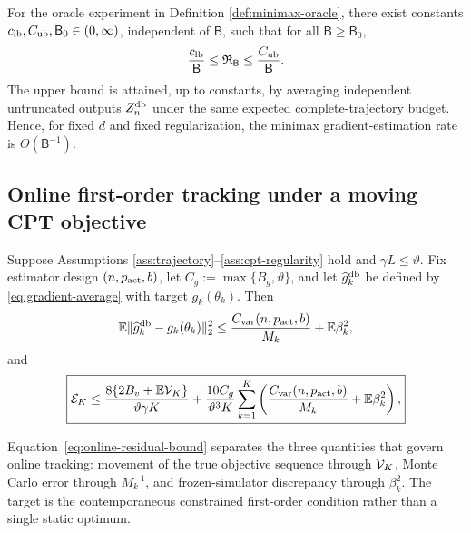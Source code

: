 \begin{theorem}\label{thm:minimax}
For the oracle experiment in Definition \ref{def:minimax-oracle}, there exist constants
$c_{\rm lb},C_{\rm ub},\mathsf B_0\in(0,\infty)$, independent of $\mathsf B$, such that for all $\mathsf B\ge\mathsf B_0$,
\begin{equation}\label{eq:minimax-rate}
 \frac{c_{\rm lb}}{\mathsf B}
 \le \mathfrak R_{\mathsf B}
 \le \frac{C_{\rm ub}}{\mathsf B}.
\end{equation}
The upper bound is attained, up to constants, by averaging independent untruncated outputs $Z_n^{\mathrm{db}}$ under the same expected complete-trajectory budget.  Hence, for fixed $d$ and fixed regularization, the minimax gradient-estimation rate is $\Theta(\mathsf B^{-1})$.
\end{theorem}

\subsection{Online first-order tracking under a moving CPT objective}

\begin{theorem}\label{thm:online-residual}
Suppose Assumptions \ref{ass:trajectory}--\ref{ass:cpt-regularity} hold and $\gamma L\le\vartheta$.  Fix estimator design $(n,p_{\rm act},b)$, let $C_g:=\max\{B_g,\vartheta\}$, and let $\widehat g_k^{\mathrm{db}}$ be defined by \eqref{eq:gradient-average} with target $\widetilde g_k(\theta_k)$.  Then
\begin{equation}\label{eq:true-gradient-mse}
 \mathbb E\lVert\widehat g_k^{\mathrm{db}}-g_k(\theta_k)\rVert_2^2
 \le\frac{C_{\rm var}(n,p_{\rm act},b)}{M_k}+\mathbb E\beta_k^2,
\end{equation}
and
\begin{equation}\label{eq:online-residual-bound}
 \boxed{
 \mathcal E_K
 \le
 \frac{8\{2B_v+\mathbb E\mathcal V_K\}}{\vartheta\gamma K}
 +\frac{10C_g}{\vartheta^3K}
 \sum_{k=1}^{K}
 \left(\frac{C_{\rm var}(n,p_{\rm act},b)}{M_k}+\mathbb E\beta_k^2\right),
 }
\end{equation}
\end{theorem}

Equation~\eqref{eq:online-residual-bound} separates the three quantities that govern online tracking: movement of the true objective sequence through $\mathcal V_K$, Monte Carlo error through $M_k^{-1}$, and frozen-simulator discrepancy through $\beta_k^2$.  The target is the contemporaneous constrained first-order condition rather than a single static optimum.

